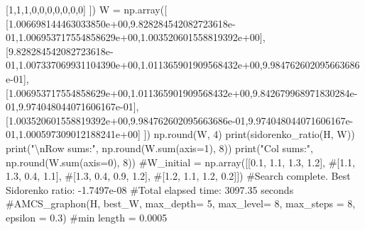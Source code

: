 \documentclass[
  letterpaper,
  DIV=11,
  numbers=noendperiod]{scrartcl}
\newenvironment{Shaded}{\begin{snugshade}}{\end{snugshade}}
\newcommand{\BuiltInTok}[1]{\textcolor[rgb]{0.00,0.23,0.31}{#1}}
\newcommand{\CharTok}[1]{\textcolor[rgb]{0.13,0.47,0.30}{#1}}
\newcommand{\CommentTok}[1]{\textcolor[rgb]{0.37,0.37,0.37}{#1}}
\newcommand{\DecValTok}[1]{\textcolor[rgb]{0.68,0.00,0.00}{#1}}
\newcommand{\FloatTok}[1]{\textcolor[rgb]{0.68,0.00,0.00}{#1}}
\newcommand{\NormalTok}[1]{\textcolor[rgb]{0.00,0.23,0.31}{#1}}
\newcommand{\OperatorTok}[1]{\textcolor[rgb]{0.37,0.37,0.37}{#1}}
\newcommand{\StringTok}[1]{\textcolor[rgb]{0.13,0.47,0.30}{#1}}
\begin{document}
\begin{Shaded}
\begin{Highlighting}[]
\NormalTok{    [}\DecValTok{1}\NormalTok{,}\DecValTok{1}\NormalTok{,}\DecValTok{1}\NormalTok{,}\DecValTok{0}\NormalTok{,}\DecValTok{0}\NormalTok{,}\DecValTok{0}\NormalTok{,}\DecValTok{0}\NormalTok{,}\DecValTok{0}\NormalTok{,}\DecValTok{0}\NormalTok{,}\DecValTok{0}\NormalTok{]}
\NormalTok{])}
\NormalTok{W }\OperatorTok{=}\NormalTok{ np.array([}
\NormalTok{  [}\FloatTok{1.006698144463033850e+00}\NormalTok{,}\FloatTok{9.828284542082723618e{-}01}\NormalTok{,}\FloatTok{1.006953717554858629e+00}\NormalTok{,}\FloatTok{1.003520601558819392e+00}\NormalTok{],}
\NormalTok{[}\FloatTok{9.828284542082723618e{-}01}\NormalTok{,}\FloatTok{1.007337069931104390e+00}\NormalTok{,}\FloatTok{1.011365901909568432e+00}\NormalTok{,}\FloatTok{9.984762602095663686e{-}01}\NormalTok{],}
\NormalTok{[}\FloatTok{1.006953717554858629e+00}\NormalTok{,}\FloatTok{1.011365901909568432e+00}\NormalTok{,}\FloatTok{9.842679968971830284e{-}01}\NormalTok{,}\FloatTok{9.974048044071606167e{-}01}\NormalTok{],}
\NormalTok{[}\FloatTok{1.003520601558819392e+00}\NormalTok{,}\FloatTok{9.984762602095663686e{-}01}\NormalTok{,}\FloatTok{9.974048044071606167e{-}01}\NormalTok{,}\FloatTok{1.000597309012188241e+00}\NormalTok{]}
\NormalTok{])}
\NormalTok{np.}\BuiltInTok{round}\NormalTok{(W, }\DecValTok{4}\NormalTok{)}
\BuiltInTok{print}\NormalTok{(sidorenko\_ratio(H, W))}
\BuiltInTok{print}\NormalTok{(}\StringTok{"}\CharTok{\textbackslash{}n}\StringTok{Row sums:"}\NormalTok{, np.}\BuiltInTok{round}\NormalTok{(W.}\BuiltInTok{sum}\NormalTok{(axis}\OperatorTok{=}\DecValTok{1}\NormalTok{), }\DecValTok{8}\NormalTok{))}
\BuiltInTok{print}\NormalTok{(}\StringTok{"Col sums:"}\NormalTok{, np.}\BuiltInTok{round}\NormalTok{(W.}\BuiltInTok{sum}\NormalTok{(axis}\OperatorTok{=}\DecValTok{0}\NormalTok{), }\DecValTok{8}\NormalTok{))}
\CommentTok{\#W\_initial = np.array([[0.1, 1.1, 1.3, 1.2],}
\CommentTok{\#[1.1, 1.3, 0.4, 1.1],}
\CommentTok{\#[1.3, 0.4, 0.9, 1.2],}
\CommentTok{\#[1.2, 1.1, 1.2, 0.2]])}
\CommentTok{\#Search complete. Best Sidorenko ratio: {-}1.7497e{-}08}
\CommentTok{\#Total elapsed time: 3097.35 seconds}
\CommentTok{\#AMCS\_graphon(H, best\_W, max\_depth= 5, max\_level= 8, max\_steps = 8, epsilon = 0.3)}
\CommentTok{\#min length = 0.0005}


\end{Highlighting}
\end{Shaded}
\end{document}

